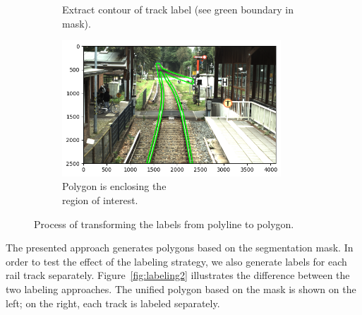 \documentclass[Master,MDS,english]{BASE/twbook} %
\begin{document}
\begin{figure}
\begin{subfigure}[t]{.5\textwidth}
  \caption{Extract contour of track label (see green boundary in mask).}
\end{subfigure}%
\begin{subfigure}[t]{.5\textwidth}
  \centering
  \includegraphics[width=0.9\textwidth]{images/labeling/final}
  \caption{Polygon is enclosing the \\ region of interest.}
\end{subfigure}
\caption{Process of transforming the labels from  polyline to polygon.}
\label{fig:labeling}
\end{figure}


The presented approach generates polygons based on the segmentation mask. In order to test the effect of the labeling strategy, we also generate labels for each rail track separately. Figure~\ref{fig:labeling2} illustrates the difference between the two labeling approaches. The unified polygon based on the mask is shown on the left; on the right, each track is labeled separately.
\end{document}
